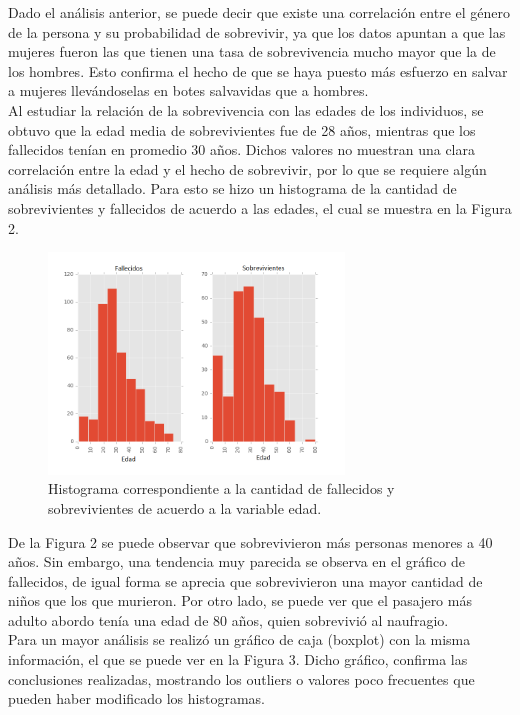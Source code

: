 \documentclass[letter, 10pt]{article}
\begin{document}
Dado el análisis anterior, se puede decir que existe una correlación entre el género de la persona y su probabilidad de sobrevivir, ya que los datos apuntan a que las mujeres fueron las que tienen una tasa de sobrevivencia mucho mayor que la de los hombres. Esto confirma el hecho de que se haya puesto más esfuerzo en salvar a mujeres llevándoselas en botes salvavidas que a hombres.\\

Al estudiar la relación de la sobrevivencia con las edades de los individuos, se obtuvo que la edad media de sobrevivientes fue de 28 años, mientras que los fallecidos tenían en promedio 30 años. Dichos valores no muestran una clara correlación entre la edad y el hecho de sobrevivir, por lo que se requiere algún análisis más detallado. Para esto se hizo un histograma de la cantidad de sobrevivientes y fallecidos de acuerdo a las edades, el cual se muestra en la Figura 2.\\

\begin{figure}[h]
\begin{center}
\includegraphics[width=0.7\textwidth]{Images/figure_4.png}
\caption{Histograma correspondiente a la cantidad de fallecidos y sobrevivientes de acuerdo a la variable edad.}
\end{center}
\end{figure}

De la Figura 2 se puede observar que sobrevivieron más personas menores a 40 años. Sin embargo, una tendencia muy parecida se observa en el gráfico de fallecidos, de igual forma se aprecia que sobrevivieron una mayor cantidad de niños que los que murieron. Por otro lado, se puede ver que el pasajero más adulto abordo tenía una edad de 80 años, quien sobrevivió al naufragio.\\

Para un mayor análisis se realizó un gráfico de caja (boxplot) con la misma información, el que se puede ver en la Figura 3. Dicho gráfico, confirma las conclusiones realizadas, mostrando los outliers o valores poco frecuentes que pueden haber modificado los histogramas.\\
\end{document}

